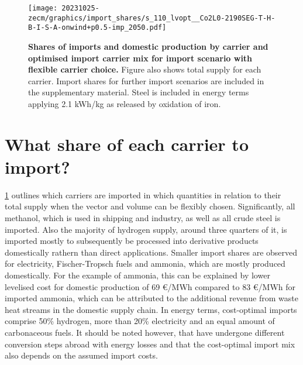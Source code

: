 \begin{figure}
    \texttt{[image: 20231025-zecm/graphics/import\_shares/s\_110\_lvopt\_\_Co2L0-2190SEG-T-H-B-I-S-A-onwind+p0.5-imp\_2050.pdf]}
    \caption{\textbf{Shares of imports and domestic production by carrier and optimised import carrier mix for import scenario with flexible carrier choice.} 
        Figure also shows total supply for each carrier.
        Import shares for further import scenarios are included in the supplementary material.
        Steel is included in energy terms applying 2.1 kWh/kg as released by oxidation of iron.
    }
    \label{fig:import-shares}
\end{figure}

\section*{What share of each carrier to import?}

\cref{fig:import-shares} outlines which carriers are imported in which
quantities in relation to their total supply when the vector and volume can be
flexibly chosen. Significantly, all methanol, which is used in shipping and
industry, as well as all crude steel is imported. Also the majority of hydrogen
supply, around three quarters of it, is imported mostly to subsequently be
processed into derivative products domestically rathern than direct
applications. Smaller import shares are observed for electricity,
Fischer-Tropsch fuels and ammonia, which are mostly produced domestically. For
the example of ammonia, this can be explained by lower levelised cost for
domestic production of 69 \euro{}/MWh compared to 83 \euro{}/MWh for imported
ammonia, which can be attributed to the additional revenue from waste heat
streams in the domestic supply chain. In energy terms, cost-optimal imports
comprise 50\% hydrogen, more than 20\% electricity and an equal amount of
carbonaceous fuels. It should be noted however, that have undergone different
conversion steps abroad with energy losses and that the cost-optimal import mix
also depends on the assumed import costs.


